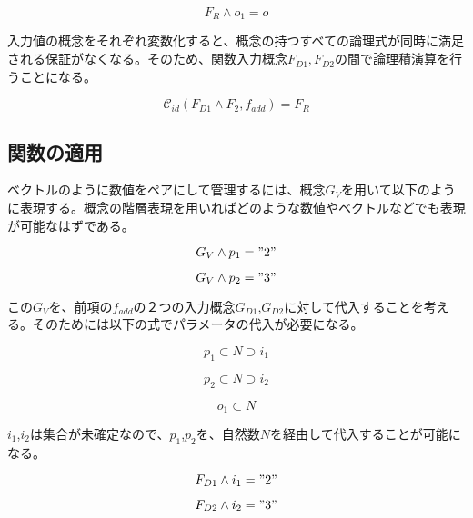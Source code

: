 \documentclass[12pt]{article}
\begin{document}
\begin{equation} F_{R} \wedge o_1 = o\end{equation}

入力値の概念をそれぞれ変数化すると、概念の持つすべての論理式が同時に満足される保証がなくなる。そのため、関数入力概念\(F_{D1},F_{D2}\)の間で論理積演算を行うことになる。

\begin{equation}  \mathcal{C}_{id}(F_{D1} \wedge F_{2} , f_{add}) = F_{R}\end{equation}

\subsection{関数の適用}\label{ux95a2ux6570ux306eux9069ux7528}

ベクトルのように数値をペアにして管理するには、概念\(G_V\)を用いて以下のように表現する。概念の階層表現を用いればどのような数値やベクトルなどでも表現が可能なはずである。

\begin{equation} G_V \wedge p_1 = "2" \end{equation}

\begin{equation} G_V \wedge p_2 = "3" \end{equation}

この\(G_V\)を、前項の\(f_{add}\)の２つの入力概念\(G_{D1}\),\(G_{D2}\)に対して代入することを考える。そのためには以下の式でパラメータの代入が必要になる。

\begin{equation} p_1 \subset N \supset i_1 \end{equation}

\begin{equation} p_2 \subset N \supset i_2 \end{equation}

\begin{equation} o_1 \subset N \end{equation}

\(i_1\),\(i_2\)は集合が未確定なので、\(p_1\),\(p_2\)を、自然数\(N\)を経由して代入することが可能になる。

\begin{equation} F_{D1} \wedge i_1 = "2"\end{equation}

\begin{equation} F_{D2} \wedge i_2 = "3"\end{equation}
\end{document}
